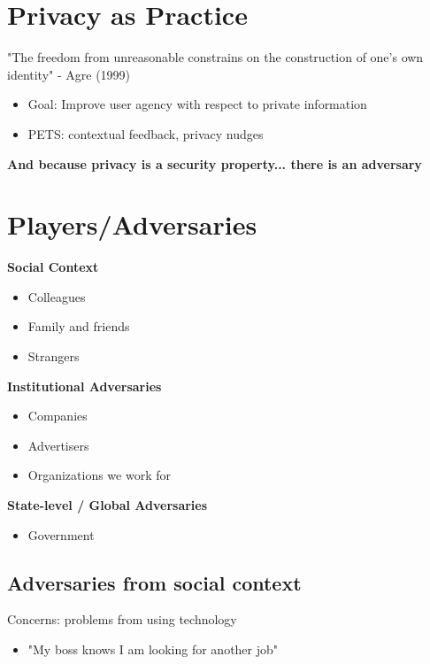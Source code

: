 \documentclass[11pt]{article}
\begin{document}
\section*{Privacy as Practice}
"The freedom from unreasonable constrains on the construction of one's own identity" - Agre (1999)

\begin{itemize}
	\item Goal: Improve user agency with respect to private information
	\item PETS: contextual feedback, privacy nudges
\end{itemize}

\vspace{0.5cm}

\begin{center}
  {\LARGE \textbf{And because privacy is a security property... there is an adversary}}
\end{center}
\vspace{0.5cm}

\section*{Players/Adversaries}

\textbf{Social Context}
\begin{itemize}
	\item Colleagues
	\item Family and friends
	\item Strangers
\end{itemize}

\textbf{Institutional Adversaries}
\begin{itemize}
	\item Companies
	\item Advertisers
	\item Organizations we work for
\end{itemize}

\textbf{State-level / Global Adversaries}
\begin{itemize}
	\item Government
\end{itemize}

\subsection*{Adversaries from social context}

Concerns: problems from using technology
\begin{itemize}
	\item "My boss knows I am looking for another job"
\end{itemize}
\end{document}
